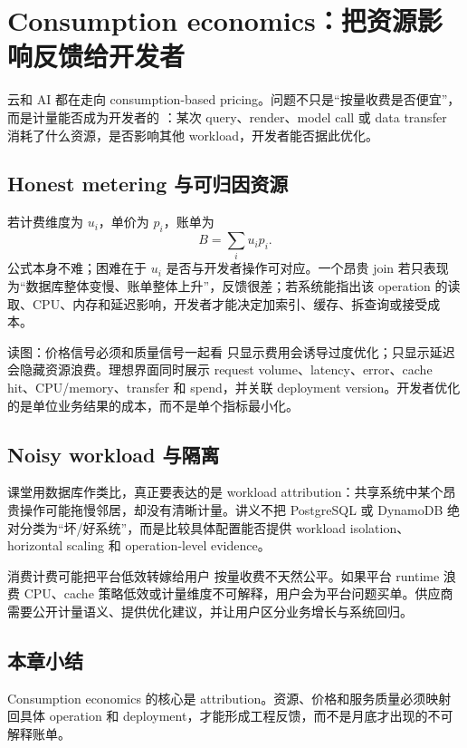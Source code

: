 \section{Consumption economics：把资源影响反馈给开发者}

云和 AI 都在走向 consumption-based pricing。问题不只是“按量收费是否便宜”，而是计量能否成为开发者的 ：某次 query、render、model call 或 data transfer 消耗了什么资源，是否影响其他 workload，开发者能否据此优化。

\subsection{Honest metering 与可归因资源}

若计费维度为 $u_i$，单价为 $p_i$，账单为
\[
B=\sum_i u_i p_i.
\]
公式本身不难；困难在于 $u_i$ 是否与开发者操作可对应。一个昂贵 join 若只表现为“数据库整体变慢、账单整体上升”，反馈很差；若系统能指出该 operation 的读取、CPU、内存和延迟影响，开发者才能决定加索引、缓存、拆查询或接受成本。


\begin{knowledgebox}{读图：价格信号必须和质量信号一起看}
只显示费用会诱导过度优化；只显示延迟会隐藏资源浪费。理想界面同时展示 request volume、latency、error、cache hit、CPU/memory、transfer 和 spend，并关联 deployment version。开发者优化的是单位业务结果的成本，而不是单个指标最小化。
\end{knowledgebox}

\subsection{Noisy workload 与隔离}

课堂用数据库作类比，真正要表达的是 workload attribution：共享系统中某个昂贵操作可能拖慢邻居，却没有清晰计量。讲义不把 PostgreSQL 或 DynamoDB 绝对分类为“坏/好系统”，而是比较具体配置能否提供 workload isolation、horizontal scaling 和 operation-level evidence。


\begin{warningbox}{消费计费可能把平台低效转嫁给用户}
按量收费不天然公平。如果平台 runtime 浪费 CPU、cache 策略低效或计量维度不可解释，用户会为平台问题买单。供应商需要公开计量语义、提供优化建议，并让用户区分业务增长与系统回归。
\end{warningbox}

\subsection{本章小结}

Consumption economics 的核心是 attribution。资源、价格和服务质量必须映射回具体 operation 和 deployment，才能形成工程反馈，而不是月底才出现的不可解释账单。

